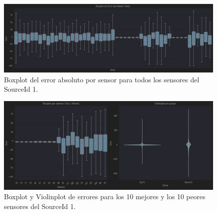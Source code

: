 \begin{figure}[H]
	\centering
	\includegraphics[width=0.75\linewidth]{includes/cap5/graphs/advanced/sid1_all_meters_error_boxplot.png}
	\caption{Boxplot del error absoluto por sensor para todos los sensores del SourceId 1.}
	\label{fig:sid1_boxplot_all}
\end{figure}

\begin{figure}[H]
	\centering
	\includegraphics[width=0.75\linewidth]{includes/cap5/graphs/advanced/sid1_10best_10worst_meter_boxplot_violinplot.png}
	\caption{Boxplot y Violinplot de errores para los 10 mejores y los 10 peores sensores del SourceId 1.}
	\label{fig:sid1_violinplot_best_worst}
\end{figure}


